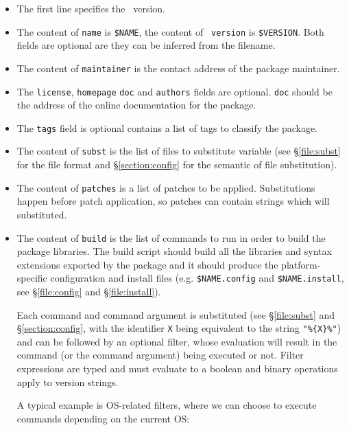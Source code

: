 \documentclass[a4paper,10pt]{article}
\begin{document}
\begin{itemize}

\item The first line specifies the \OPAM\ version.

\item The content of {\tt name} is \verb+$NAME+, the content of {\tt
  version} is \verb+$VERSION+. Both fields are optional are they can
  be inferred from the filename.

\item The content of {\tt maintainer} is the contact address of the
  package maintainer.

\item The {\tt license}, {\tt homepage} {\tt doc} and {\tt authors}
  fields are optional. {\tt doc} should be the address of the online
  documentation for the package.

\item The {\tt tags} field is optional contains a list of tags to
  classify the package.

\item The content of {\tt subst} is the list of files to substitute
  variable (see \S\ref{file:subst} for the file format and
  \S\ref{section:config} for the semantic of file substitution).

\item The content of {\tt patches} is a list of patches to be applied.
  Substitutions happen before patch application, so patches can
  contain strings which will substituted.

\item The content of {\tt build} is the list of commands to run in
  order to build the package libraries. The build script should build
  all the libraries and syntax extensions exported by the package and
  it should produce the platform-specific configuration and install
  files (e.g. \verb+$NAME.config+ and \verb+$NAME.install+, see
  \S\ref{file:config} and \S\ref{file:install}).

   Each command and command argument is substituted (see
   \S\ref{file:subst} and \S\ref{section:config}, with the identifier
   {\tt X} being equivalent to the string {\tt "\%\{X\}\%"})
   and can be followed by an optional filter, whose evaluation will
   result in the command (or the command argument) being executed
   or not. Filter expressions are typed and must evaluate to a
   boolean and binary operations apply to version strings.

   A typical example is OS-related filters, where we can choose
   to execute commands depending on the current OS:


\end{itemize}
\end{document}
